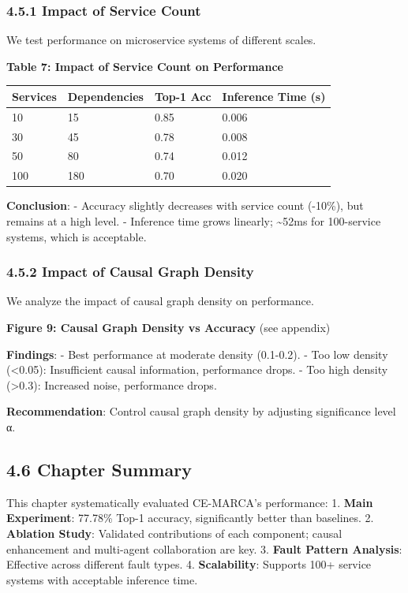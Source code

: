 \hypertarget{impact-of-service-count}{%
\subsubsection{4.5.1 Impact of Service
Count}\label{impact-of-service-count}}

We test performance on microservice systems of different scales.

\textbf{Table 7: Impact of Service Count on Performance}

\begin{longtable}[]{@{}llll@{}}
\toprule
Services & Dependencies & Top-1 Acc & Inference Time (s)\tabularnewline
\midrule
\endhead
10 & 15 & 0.85 & 0.006\tabularnewline
30 & 45 & 0.78 & 0.008\tabularnewline
50 & 80 & 0.74 & 0.012\tabularnewline
100 & 180 & 0.70 & 0.020\tabularnewline
\bottomrule
\end{longtable}

\textbf{Conclusion}: - Accuracy slightly decreases with service count
(-10\%), but remains at a high level. - Inference time grows linearly;
\textasciitilde52ms for 100-service systems, which is acceptable.

\hypertarget{impact-of-causal-graph-density}{%
\subsubsection{4.5.2 Impact of Causal Graph
Density}\label{impact-of-causal-graph-density}}

We analyze the impact of causal graph density on performance.

\textbf{Figure 9: Causal Graph Density vs Accuracy} (see appendix)

\textbf{Findings}: - Best performance at moderate density (0.1-0.2). -
Too low density (\textless0.05): Insufficient causal information,
performance drops. - Too high density (\textgreater0.3): Increased
noise, performance drops.

\textbf{Recommendation}: Control causal graph density by adjusting
significance level α.

\hypertarget{chapter-summary}{%
\subsection{4.6 Chapter Summary}\label{chapter-summary}}

This chapter systematically evaluated CE-MARCA's performance: 1.
\textbf{Main Experiment}: 77.78\% Top-1 accuracy, significantly better
than baselines. 2. \textbf{Ablation Study}: Validated contributions of
each component; causal enhancement and multi-agent collaboration are
key. 3. \textbf{Fault Pattern Analysis}: Effective across different
fault types. 4. \textbf{Scalability}: Supports 100+ service systems with
acceptable inference time.

